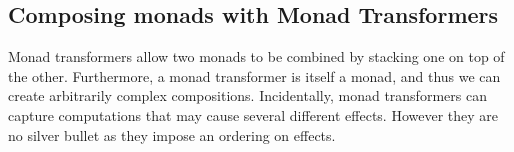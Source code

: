\subsection{Composing monads with Monad Transformers}
Monad transformers allow two monads to be combined by stacking one on top of the other. 
Furthermore, a monad transformer is itself a monad, and thus we can create arbitrarily complex compositions.
Incidentally, monad transformers can capture computations that may cause several different effects.
However they are no silver bullet as they impose an ordering on effects.
